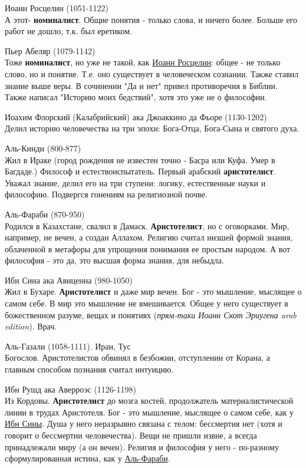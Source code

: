 \documentclass[12pt,a4paper]{article}
\begin{document}
Иоанн Росцелин (1051-1122)\\
А этот- \textbf{номиналист}. Общие понятия - только слова, и ничего более. Больше его работ не дошло, т.к. был еретиком.

Пьер Абеляр (1079-1142)\\
Тоже \textbf{номиналист}, но уже не такой, как \underline{Иоанн Росцелин}: общее - не только слово, но и понятие. Т.е. оно существует в человеческом сознании. Также ставил знание выше веры. В сочинении "Да и нет" привел противоречия в Библии. Также написал "Историю моих бедствий", хотя это уже не о философии.

Иоахим Флорский (Калабрийский) ака Джоаккино да Фьоре  (1130-1202)\\
Делил историю человечества на три эпохи: Бога-Отца, Бога-Сына и святого духа.

Аль-Кинди (800-877)\\
Жил в Ираке (город рождения не известен точно - Басра или Куфа. Умер в Багдаде.) Философ и естествоиспытатель. Первый арабский \textbf{аристотелист}. Уважал знание, делил его на три ступени: логику, естественные науки и философию. Подвергся гонениям на религиозной почве.

Аль-Фараби (870-950)\\
Родился в Казахстане, свалил в Дамаск. \textbf{Аристотелист}, но с оговорками. Мир, например, не вечен, а создан Аллахом. Религию считал низшей формой знания, облаченной в метафоры для упрощения понимания ее простым народом. А вот философия - это да, это высшая форма знания, для небыдла.

Ибн Сина ака Авиценна (980-1050)\\
Жил в Бухаре. \textbf{Аристотелист} и даже мир вечен. Бог - это мышление, мыслящее о самом себе. В мир это мышление не вмешивается. Общее у него существует в божественном разуме, вещах и понятиях (\textit{прям-таки Иоанн Скот Эриугена arab edition}). Врач.

Аль-Газали (1058-1111). Иран, Тус\\
Богослов. Аристотелистов обвинял в безбожии, отступлении от Корана, а главным способом познания считал интуицию. 

Ибн Рушд ака Аверроэс (1126-1198)\\ 
Из Кордовы. \textbf{Аристотелист} до мозга костей, продолжатель материалистической линии в трудах Аристотеля. Бог - это мышление, мыслящее о самом себе, как у \underline{Ибн Сины}. Душа у него неразрывно связана с телом: бессмертия нет (хотя и говорит о бессмертии человечества). Вещи не пришли извне, а всегда принадлежали миру (а он вечен). Религия и философия у него - по-разному сформулированная истина, как у \underline{Аль-Фараби}.
\end{document}
